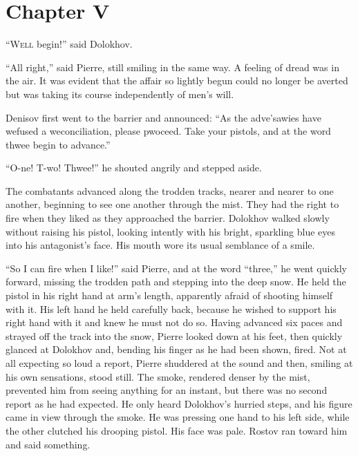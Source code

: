 \chapter*{Chapter V}
\ifaudio     
{} 
\fi

\lettrine[lines=2, loversize=0.3, lraise=0]{``\initfamily W}{ell}
begin!'' said Dolokhov.

``All right,'' said Pierre, still smiling in the same way. A
feeling of dread was in the air. It was evident that the affair
so lightly begun could no longer be averted but was taking its
course independently of men's will.

Denisov first went to the barrier and announced: ``As the
adve'sawies have wefused a weconciliation, please pwoceed. Take
your pistols, and at the word thwee begin to advance.''

``O-ne! T-wo! Thwee!'' he shouted angrily and stepped aside.

The combatants advanced along the trodden tracks, nearer and
nearer to one another, beginning to see one another through the
mist. They had the right to fire when they liked as they
approached the barrier. Dolokhov walked slowly without raising
his pistol, looking intently with his bright, sparkling blue eyes
into his antagonist's face. His mouth wore its usual semblance of
a smile.

``So I can fire when I like!'' said Pierre, and at the word
``three,'' he went quickly forward, missing the trodden path and
stepping into the deep snow. He held the pistol in his right hand
at arm's length, apparently afraid of shooting himself with
it. His left hand he held carefully back, because he wished to
support his right hand with it and knew he must not do so. Having
advanced six paces and strayed off the track into the snow,
Pierre looked down at his feet, then quickly glanced at Dolokhov
and, bending his finger as he had been shown, fired.  Not at all
expecting so loud a report, Pierre shuddered at the sound and
then, smiling at his own sensations, stood still. The smoke,
rendered denser by the mist, prevented him from seeing anything
for an instant, but there was no second report as he had
expected. He only heard Dolokhov's hurried steps, and his figure
came in view through the smoke.  He was pressing one hand to his
left side, while the other clutched his drooping pistol. His face
was pale. Rostov ran toward him and said something.

